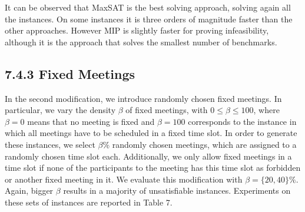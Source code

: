 \documentclass[10pt]{article}
\begin{document}
It can be observed that MaxSAT is the best solving approach, solving again all the instances. On some instances it is three orders of magnitude faster than the other approaches. However MIP is slightly faster for proving infeasibility, although it is the approach that solves the smallest number of benchmarks.

\subsection*{7.4.3 Fixed Meetings}
In the second modification, we introduce randomly chosen fixed meetings. In particular, we vary the density $\beta$ of fixed meetings, with $0 \leq \beta \leq 100$, where $\beta=0$ means that no meeting is fixed and $\beta=100$ corresponds to the instance in which all meetings have to be scheduled in a fixed time slot. In order to generate these instances, we select $\beta \%$ randomly chosen meetings, which are assigned to a randomly chosen time slot each. Additionally, we only allow fixed meetings in a time slot if none of the participants to the meeting has this time slot as forbidden or another fixed meeting in it. We evaluate this modification with $\beta=\{20,40\} \%$. Again, bigger $\beta$ results in a majority of unsatisfiable instances. Experiments on these sets of instances are reported in Table 7.
\end{document}
